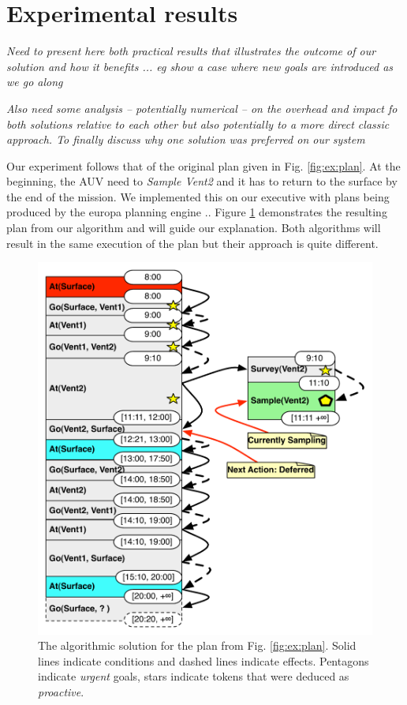 
\section{Experimental results}
\label{sec:exp}

{\em\color{gray} Need to present here both practical results that illustrates the outcome of our solution and how it benefits ... eg show a case where new goals are introduced as we go along}

{\em\color{gray} Also need some analysis -- potentially numerical -- on the overhead and impact fo both solutions relative to each other but also potentially to a more direct classic approach. 
To finally discuss why one solution was preferred on our system} 

Our experiment follows that of the original plan given in
Fig. \ref{fig:ex:plan}. At the beginning, the AUV need to {\em Sample Vent2}
and it has to return to the surface by the end of the mission. We
implemented this on our executive with plans being produced by the
europa planning engine \cite{frank2003}.. Figure \ref{fig:ex:mixed1}
demonstrates the resulting plan from our algorithm and will guide our
explanation. Both algorithms will result in the same execution of the
plan but their approach is quite different.

\begin{figure}
  \centering
  \includegraphics[width=0.8\columnwidth]{figs/example_MixedInitial}
  \caption{\small The algorithmic solution for the plan from
    Fig. \ref{fig:ex:plan}. Solid lines indicate conditions and
    dashed lines indicate effects. Pentagons indicate {\em urgent}
    goals, stars indicate tokens that were deduced as {\em proactive}.}
  \label{fig:ex:mixed1}
\end{figure}

